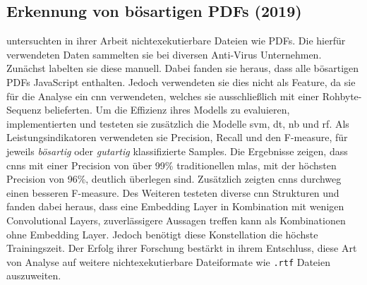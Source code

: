 \documentclass[
    12pt, %
    DIV10,
    ngerman, %
    a4paper, %
    oneside, %
    titlepage, %
    parskip=half, %
    headings=normal, %
    listof=totoc, %
    bibliography=totoc, %
    index=totoc, %
    captions=tableheading, %
    final %
]{scrreprt}
\begin{document}
\subsection{Erkennung von bösartigen PDFs (2019)}
\textcite{Jeong2019} untersuchten in ihrer Arbeit nichtexekutierbare Dateien wie PDFs. Die hierfür verwendeten Daten sammelten sie bei diversen Anti-Virus Unternehmen. Zunächst labelten sie diese manuell. Dabei fanden sie heraus, dass alle bösartigen PDFs JavaScript enthalten. Jedoch verwendeten sie dies nicht als Feature, da sie für die Analyse ein \ac{cnn} verwendeten, welches sie ausschließlich mit einer Rohbyte-Sequenz belieferten. Um die Effizienz ihres Modells zu evaluieren, implementierten und testeten sie zusätzlich die Modelle \ac{svm}, \ac{dt}, \acl{nb} und \ac{rf}. Als Leistungsindikatoren verwendeten sie Precision, Recall und den F-measure, für jeweils \emph{bösartig} oder \emph{gutartig} klassifizierte Samples. Die Ergebnisse zeigen, dass \ac{cnns} mit einer Precision von über 99\% traditionellen \ac{mlas}, mit der höchsten Precision von 96\%, deutlich überlegen sind. Zusätzlich zeigten \ac{cnns} durchweg einen besseren F-measure. Des Weiteren testeten \citeauthor{Jeong2019} diverse \ac{cnn} Strukturen und fanden dabei heraus, dass eine Embedding Layer in Kombination mit wenigen Convolutional Layers, zuverlässigere Aussagen treffen kann als Kombinationen ohne Embedding Layer. Jedoch benötigt diese Konstellation die höchste Trainingszeit. Der Erfolg ihrer Forschung bestärkt \citeauthor{Jeong2019} in ihrem Entschluss, diese Art von Analyse auf weitere nichtexekutierbare Dateiformate wie \texttt{.rtf} Dateien auszuweiten.
%
\end{document}
